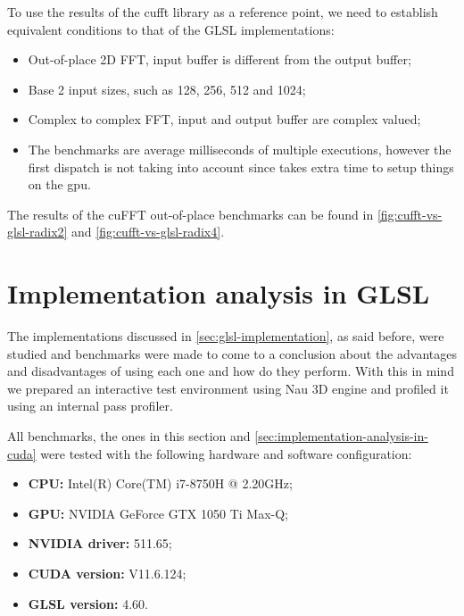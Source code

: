 \documentclass[
  oneside,
  11pt, a4paper,
  footinclude=true,
  headinclude=true,
  cleardoublepage=empty
]{scrbook}
\begin{document}
To use the results of the \acrshort{cufft} library as a reference point, we need to establish equivalent conditions to that of the GLSL implementations:

\begin{itemize}
    \item Out-of-place 2D FFT, input buffer is different from the output buffer;
    \item Base 2 input sizes, such as 128, 256, 512 and 1024;
    \item Complex to complex FFT, input and output buffer are complex valued;
    \item The benchmarks are average milliseconds of multiple executions, however the first dispatch is not taking into account since  takes extra time to setup things on the \acrshort{gpu}.
\end{itemize}

The results of the cuFFT out-of-place benchmarks can be found in \autoref{fig:cufft-vs-glsl-radix2} and \autoref{fig:cufft-vs-glsl-radix4}.

\section{Implementation analysis in GLSL}

The implementations discussed in \autoref{sec:glsl-implementation}, as said before, were studied and benchmarks were made to come to a conclusion about the advantages and disadvantages of using each one and how do they perform. With this in mind we prepared an interactive test environment using Nau 3D engine \cite{nau3d} and profiled it using an internal pass profiler.

All benchmarks, the ones in this section and \autoref{sec:implementation-analysis-in-cuda} were tested with the following hardware and software configuration:

\begin{itemize} \label{itm:benchmark-conditions}
    \item \textbf{CPU:} Intel(R) Core(TM) i7-8750H @ 2.20GHz;
    \item \textbf{GPU:} NVIDIA GeForce GTX 1050 Ti Max-Q;
    \item \textbf{NVIDIA driver:} 511.65;
    \item \textbf{CUDA version:}  V11.6.124;
    \item \textbf{GLSL version:}  4.60.
\end{itemize}
\end{document}
